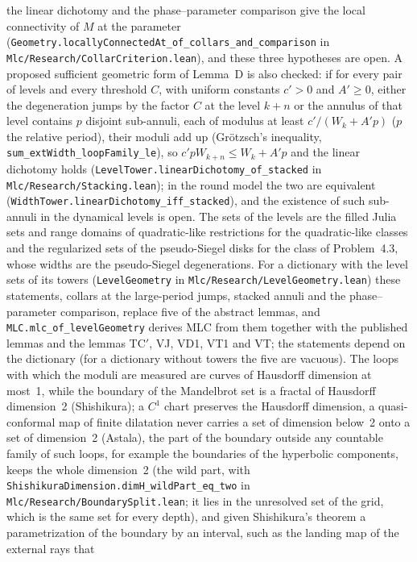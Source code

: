 \documentclass[11pt,a4paper]{article}
\begin{document}
the linear dichotomy and the phase--parameter comparison give the local connectivity of \(M\) at the
parameter (\texttt{Geometry.locallyConnectedAt\_of\_collars\_and\_comparison} in
\texttt{Mlc/Research/CollarCriterion.lean}), and these three hypotheses are open. A proposed
sufficient geometric form of Lemma~D is also checked: if for every pair of levels and every
threshold \(C\), with uniform constants \(c'>0\) and \(A'\ge0\), either the degeneration jumps by the
factor \(C\) at the level \(k+n\) or the annulus of that level contains \(p\) disjoint sub-annuli,
each of modulus at least \(c'/(W_k+A'p)\) (\(p\) the relative period), their moduli add up
(Gr\"otzsch's inequality, \texttt{sum\_extWidth\_loopFamily\_le}), so \(c'pW_{k+n}\le W_k+A'p\) and
the linear dichotomy holds (\texttt{LevelTower.linearDichotomy\_of\_stacked} in
\texttt{Mlc/Research/Stacking.lean}); in the round model the two are equivalent
(\texttt{WidthTower.linearDichotomy\_iff\_stacked}), and the existence of such sub-annuli in the
dynamical levels is open. The sets of the levels are the filled Julia sets and range domains of
quadratic-like restrictions for the quadratic-like classes and the regularized sets of the
pseudo-Siegel disks for the class of Problem~4.3, whose widths are the pseudo-Siegel
degenerations. For a dictionary with the level sets of its towers (\texttt{LevelGeometry} in
\texttt{Mlc/Research/LevelGeometry.lean}) these statements, collars at the large-period jumps,
stacked annuli and the phase--parameter comparison, replace five of the abstract lemmas, and
\texttt{MLC.mlc\_of\_levelGeometry} derives MLC from them together with the published lemmas and
the lemmas TC$'$, VJ, VD1, VT1 and VT; the statements depend on the dictionary (for a dictionary
without towers the five are vacuous). The loops with
which the moduli are measured are curves of
Hausdorff dimension at most~1, while the boundary of the Mandelbrot set is a fractal of Hausdorff
dimension~2 (Shishikura); a \(C^1\) chart preserves the Hausdorff dimension, a quasi-conformal map
of finite dilatation never carries a set of dimension below~2 onto a set of dimension~2 (Astala),
the part of the boundary outside any countable family of such loops, for example the boundaries of
the hyperbolic components, keeps the whole dimension~2 (the wild part, with
\texttt{ShishikuraDimension.dimH\_wildPart\_eq\_two} in \texttt{Mlc/Research/BoundarySplit.lean};
it lies in the unresolved set of the grid, which is the same set for every depth),
and given Shishikura's theorem a
parametrization of the boundary by an interval, such as the landing map of the external rays that
\end{document}
